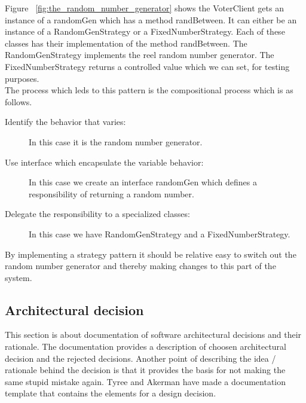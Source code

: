 \noindent
Figure ~\ref{fig:the_random_number_generator}  shows the VoterClient gets an instance of a randomGen which has a method randBetween. It can either be an instance of a RandomGenStrategy or a FixedNumberStrategy. Each of these classes has their implementation of the method randBetween. The RandomGenStrategy implements the reel random number generator. The FixedNumberStrategy returns a controlled value which we can set, for testing purposes.\\

\noindent
The process which leds to this pattern is the compositional process which is as follows.


\begin{description}
    \item[Identify the behavior that varies:] In this case it is the random number generator.  

    \item[Use interface which encapsulate the variable behavior:]  In this case we create an interface randomGen which defines a  responsibility of returning a random number.     
    
    \item[Delegate the responsibility to a specialized classes:] In this case we have RandomGenStrategy and a FixedNumberStrategy.
\end{description}

\noindent
By implementing a strategy pattern it should be relative easy to switch out the random number generator and thereby making changes to this part of the system.









\subsection{Architectural decision}
This section is about documentation of software architectural decisions and their rationale. The documentation provides a description of choosen architectural decision and the rejected decisions. Another point of describing the idea / rationale behind the decision is that it provides the basis for not making the same stupid mistake again. Tyree and Akerman have made a documentation template that contains the elements for a design decision.


